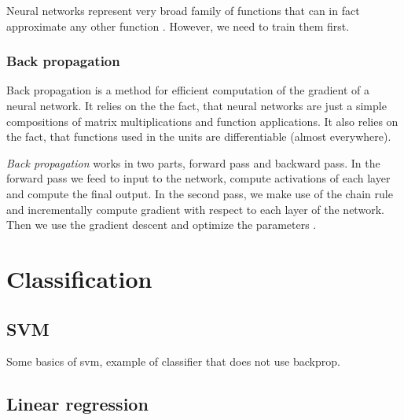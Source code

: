     Neural networks represent very broad family of functions that can in fact approximate any other function \cite{cybenko1989approximation}.
    However, we need to train them first.
    
    \subsubsection{Back propagation}
    
    Back propagation is a method for efficient computation of the gradient of a neural network.
    It relies on the the fact, that neural networks are just a simple compositions of matrix multiplications and function applications. 
    It also relies on the fact, that functions used in the units are differentiable (almost everywhere).
    
    \textit{Back propagation} works in two parts, forward pass and backward pass.
    In the forward pass we feed to input to the network, compute activations of each layer and compute the final output.
    In the second pass, we make use of the chain rule and incrementally compute gradient with respect to each layer of the network.
    Then we use the gradient descent and optimize the parameters \cite{rumelhart1986david}.
    
    \* %
    
\section{Classification}
    
    \subsection{SVM}
    
        \* %
        Some basics of svm, example of classifier that does not use backprop.
    
    \subsection{Linear regression}
    
